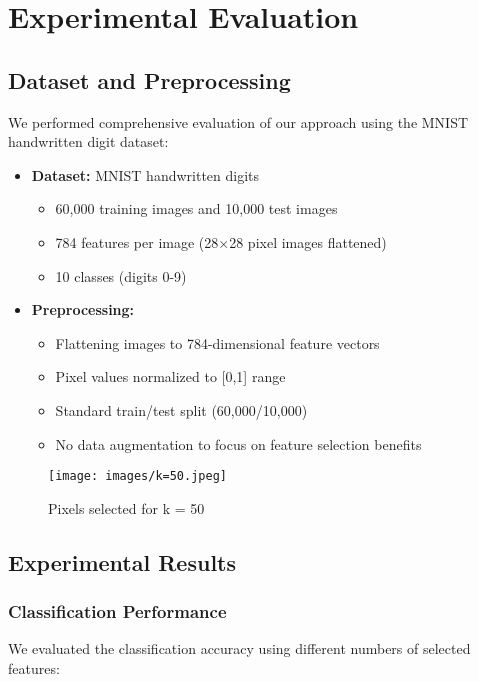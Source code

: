 \documentclass{article}
\begin{document}
\section{Experimental Evaluation}

\subsection{Dataset and Preprocessing}
We performed comprehensive evaluation of our approach using the MNIST handwritten digit dataset:

\begin{itemize}
    \item \textbf{Dataset:} MNIST handwritten digits
    \begin{itemize}
        \item 60,000 training images and 10,000 test images
        \item 784 features per image (28$\times$28 pixel images flattened)
        \item 10 classes (digits 0-9)
    \end{itemize}
    \item \textbf{Preprocessing:}
    \begin{itemize}
        \item Flattening images to 784-dimensional feature vectors
        \item Pixel values normalized to [0,1] range
        \item Standard train/test split (60,000/10,000)
        \item No data augmentation to focus on feature selection benefits
    \end{itemize}
\end{itemize}

 \begin{figure}
     \centering
     \texttt{[image: images/k=50.jpeg]}
     \caption{Pixels selected for k = 50}
     \label{fig:enter-label}
 \end{figure}

\subsection{Experimental Results}

\subsubsection{Classification Performance}
We evaluated the classification accuracy using different numbers of selected features:
\end{document}

